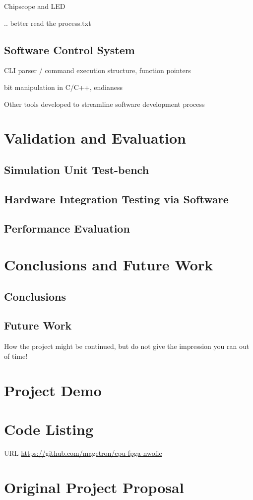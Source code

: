 \documentclass[a4paper]{report}
\begin{document}
Chipscope and LED

.. better read the process.txt

\section{Software Control System}

CLI parser / command execution structure, function pointers

bit manipulation in C/C++, endianess

Other tools developed to streamline software development process

\chapter{Validation and Evaluation}

\section{Simulation Unit Test-bench}

\section{Hardware Integration Testing via Software}

\section{Performance Evaluation}

\chapter{Conclusions and Future Work}

\section{Conclusions}

\section{Future Work}
How the project might be continued, but do not give the impression you ran out of time!

\printbibliography[title=References]

\appendix

\chapter{Project Demo}

\chapter{Code Listing}

URL \url{https://github.com/magetron/cpu-fpga-nwofle}

\chapter{Original Project Proposal}
\end{document}
